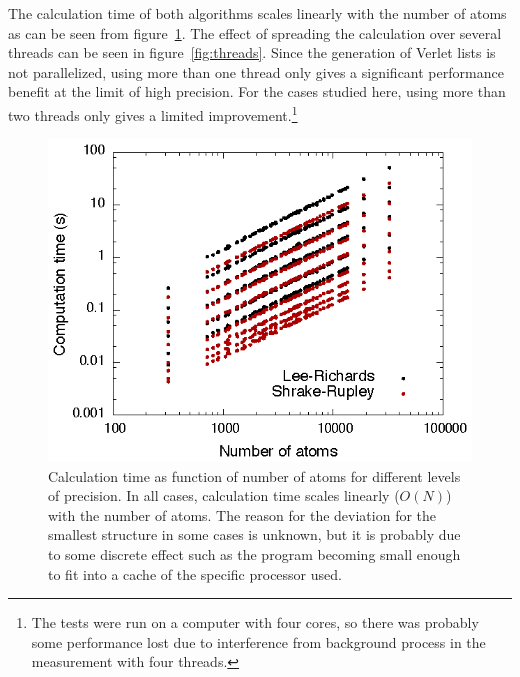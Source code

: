 \documentclass[a4paper,11pt]{article}
\begin{document}
The calculation time of both algorithms scales linearly with the
number of atoms as can be seen from figure~\ref{fig:scaling}. The
effect of spreading the calculation over several threads can be seen
in figure~\ref{fig:threads}. Since the generation of Verlet lists is
not parallelized, using more than one thread only gives a significant
performance benefit at the limit of high precision. For the cases
studied here, using more than two threads only gives a limited
improvement.\footnote{The tests were run on a computer with four
  cores, so there was probably some performance lost due to
  interference from background process in the measurement with four
  threads.}
\begin{figure}
  \begin{center}
  \includegraphics{fig/scaling}
  \caption{Calculation time as function of number of atoms for
    different levels of precision. In all cases, calculation time
    scales linearly ($O(N)$) with the number of atoms. The reason for
    the deviation for the smallest structure in some cases is unknown,
    but it is probably due to some discrete effect such as the program
    becoming small enough to fit into a cache of the specific
    processor used.
    \label{fig:scaling}}
  \end{center}
\end{figure}
\end{document}
